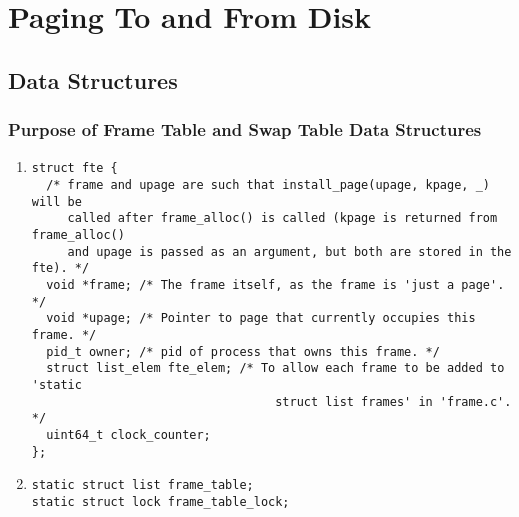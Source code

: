 \documentclass{article}
\renewcommand{\_}{\char`_}
\begin{document}
\section{Paging To and From Disk}

\subsection{Data Structures}

\subsubsection{Purpose of Frame Table and Swap Table Data Structures}

\begin{enumerate}

\item

\begin{lstlisting}
struct fte {
  /* frame and upage are such that install_page(upage, kpage, _) will be
     called after frame_alloc() is called (kpage is returned from frame_alloc()
     and upage is passed as an argument, but both are stored in the fte). */
  void *frame; /* The frame itself, as the frame is 'just a page'. */
  void *upage; /* Pointer to page that currently occupies this frame. */
  pid_t owner; /* pid of process that owns this frame. */
  struct list_elem fte_elem; /* To allow each frame to be added to 'static
                                  struct list frames' in 'frame.c'. */
  uint64_t clock_counter;
};
\end{lstlisting}

\item

\begin{lstlisting}
static struct list frame_table;
static struct lock frame_table_lock;
\end{lstlisting}

\end{enumerate}
\end{document}
